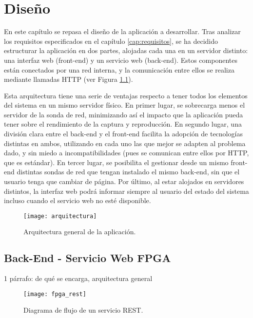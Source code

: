 \chapter{Diseño\label{cap:disenho}}

En este capítulo se repasa el diseño de la aplicación a desarrollar. Tras analizar los requisitos especificados en el capítulo \ref{cap:requisitos}, se ha decidido estructurar la aplicación en dos partes, alojadas cada una en un servidor distinto: una interfaz web (\gls{front-end}) y un servicio web (\gls{back-end}). Estos componentes están conectados por una red interna, y la comunicación entre ellos se realiza mediante llamadas  \gls{HTTP} (ver Figura \ref{fig:arquitectura}).

Esta arquitectura tiene una serie de ventajas respecto a tener todos los elementos del sistema en un mismo servidor físico.
En primer lugar, se sobrecarga menos el servidor de la sonda de red, minimizando así el impacto que la aplicación pueda tener sobre el rendimiento de la captura y reproducción.
En segundo lugar, una división clara entre el \gls{back-end} y el \gls{front-end} facilita la adopción de tecnologías distintas en ambos, utilizando en cada uno las que mejor se adapten al problema dado, y sin miedo a incompatibilidades (pues se comunican entre ellos por \gls{HTTP}, que es estándar).
En tercer lugar, se posibilita el gestionar desde un mismo \gls{front-end} distintas sondas de red que tengan instalado el mismo \gls{back-end}, sin que el usuario tenga que cambiar de página.
Por último, al estar alojados en servidores distintos, la interfaz web podrá informar siempre al usuario del estado del sistema incluso cuando el servicio web no esté disponible.

\begin{figure}[!htp]
  \centering
  \texttt{[image: arquitectura]}
  \caption{Arquitectura general de la aplicación.}
  \label{fig:arquitectura}
\end{figure}


\section{Back-End - Servicio Web FPGA\label{sec:dis:servicio_web_fpga}}

1 párrafo: de qué se encarga, arquitectura general

\begin{figure}[!htp]
  \centering
  \texttt{[image: fpga\_rest]}
  \caption{Diagrama de flujo de un servicio \gls{REST}.}
  \label{fig:fpga_rest}
\end{figure}

